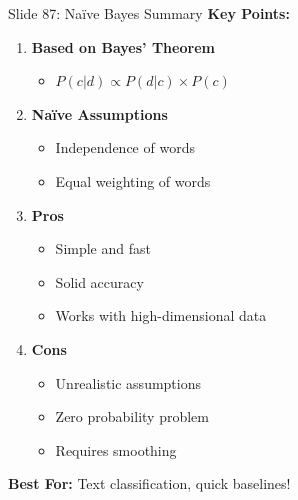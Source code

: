 \documentclass[8pt]{beamer}
\begin{document}
	\begin{frame}{Slide 87: Naïve Bayes Summary}
		\fontsize{6.5}{7.5}\selectfont
		\textbf{Key Points:}
		\begin{enumerate}
			\item \textbf{Based on Bayes' Theorem}
			\begin{itemize}
				\item $P(c|d) \propto P(d|c) \times P(c)$
			\end{itemize}
			\item \textbf{Naïve Assumptions}
			\begin{itemize}
				\item Independence of words
				\item Equal weighting of words
			\end{itemize}
			\item \textbf{Pros}
			\begin{itemize}
				\item Simple and fast
				\item Solid accuracy
				\item Works with high-dimensional data
			\end{itemize}
			\item \textbf{Cons}
			\begin{itemize}
				\item Unrealistic assumptions
				\item Zero probability problem
				\item Requires smoothing
			\end{itemize}
		\end{enumerate}
		
		\textcolor{myblue}{\textbf{Best For:}} Text classification, quick baselines!
	\end{frame}
	
\end{document}
